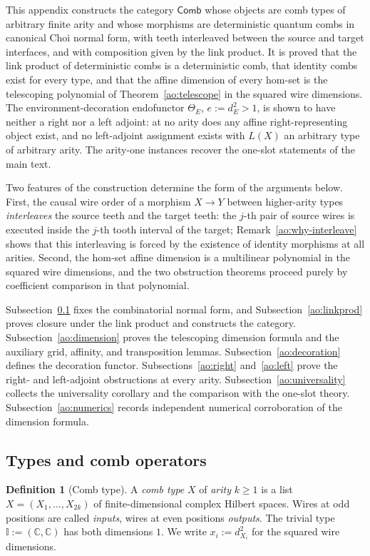 \documentclass[11pt,a4paper]{article}
\theoremstyle{definition}
\newtheorem{definition}{Definition}[section]
\theoremstyle{plain}
\theoremstyle{remark}
\newcommand{\Comb}{\mathsf{Comb}}
\begin{document}
This appendix constructs the category $\Comb$ whose objects are comb
types of arbitrary finite arity and whose morphisms are deterministic
quantum combs in canonical Choi normal form, with teeth interleaved
between the source and target interfaces, and with composition given by
the link product. It is proved that the link product of deterministic
combs is a deterministic comb, that identity combs exist for every
type, and that the affine dimension of every hom-set is the telescoping
polynomial of Theorem~\ref{ao:telescope} in the squared wire
dimensions. The environment-decoration endofunctor $\Theta_E$,
$e:=d_E^2>1$, is shown to have neither a right nor a left adjoint: at
no arity does any affine right-representing object exist, and no
left-adjoint assignment exists with $L(X)$ an arbitrary type of
arbitrary arity. The arity-one instances recover the one-slot
statements of the main text.

Two features of the construction determine the form of the arguments
below. First, the causal wire order of a morphism $X\to Y$ between
higher-arity types \emph{interleaves} the source teeth and the target
teeth: the $j$-th pair of source wires is executed inside the $j$-th
tooth interval of the target; Remark~\ref{ao:why-interleave} shows that
this interleaving is forced by the existence of identity morphisms at
all arities. Second, the hom-set affine dimension is a multilinear
polynomial in the squared wire dimensions, and the two obstruction
theorems proceed purely by coefficient comparison in that polynomial.

Subsection~\ref{ao:category} fixes the combinatorial normal form, and
Subsection~\ref{ao:linkprod} proves closure under the link product and
constructs the category. Subsection~\ref{ao:dimension} proves the
telescoping dimension formula and the auxiliary grid, affinity, and
transposition lemmas. Subsection~\ref{ao:decoration} defines the
decoration functor. Subsections~\ref{ao:right} and~\ref{ao:left} prove
the right- and left-adjoint obstructions at every arity.
Subsection~\ref{ao:universality} collects the universality corollary
and the comparison with the one-slot theory.
Subsection~\ref{ao:numerics} records independent numerical
corroboration of the dimension formula.


\subsection{Types and comb operators}
\label{ao:category}

\begin{definition}[Comb type]
A \emph{comb type} $X$ of \emph{arity} $k\ge 1$ is a list
$X=(X_1,\dots,X_{2k})$ of finite-dimensional complex Hilbert spaces. Wires
at odd positions are called \emph{inputs}, wires at even positions
\emph{outputs}. The trivial type $\mathbb I:=(\mathbb C,\mathbb C)$ has both
dimensions $1$. We write $x_i:=d_{X_i}^2$ for the squared wire dimensions.
\end{definition}
\end{document}
